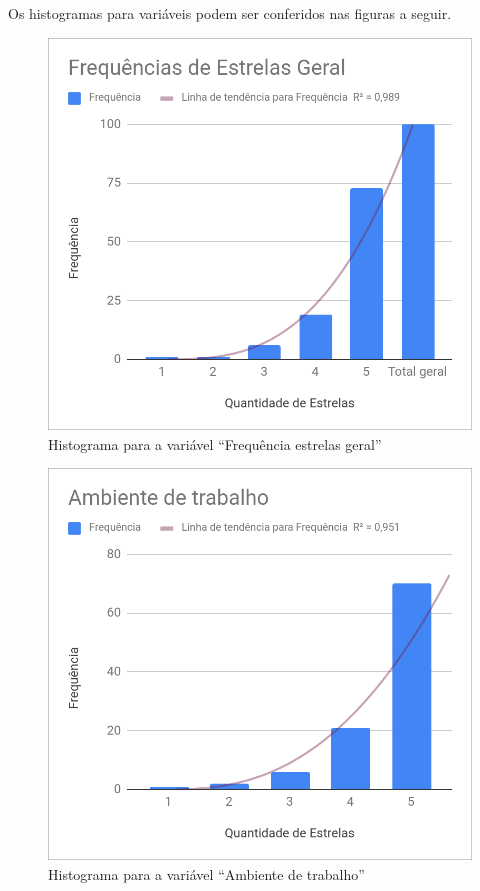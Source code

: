 	Os histogramas para variáveis podem ser conferidos nas figuras a seguir.
	
	\begin{figure}[h]
		\centering
		\caption{Histograma para a variável ``Frequência estrelas geral''}
		\label{fig:estrelas}
		\includegraphics[width=1\linewidth]{img/freq_estrelas_geral}
	\end{figure}

	\begin{figure}[h]
		\centering
		\caption{Histograma para a variável ``Ambiente de trabalho''}
		\label{fig:ambientetrabalho}
		\includegraphics[width=1\linewidth]{img/ambiente_trabalho}
	\end{figure}
	

